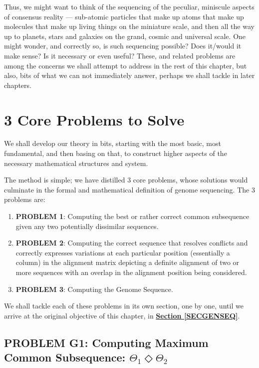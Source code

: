 \documentclass[a4paper, 18pt]{book} %
\begin{document}
Thus, we might want to think of the sequencing of the peculiar, miniscule aspects of consensus reality --- sub-atomic particles that make up atoms that make up molecules that make up living things on the miniature scale, and then all the way up to planets, stars and galaxies on the grand, cosmic and universal scale. One might wonder, and correctly so, is such sequencing possible? Does it/would it make sense? Is it necessary or even useful? These, and related problems are among the concerns we shall attempt to address in the rest of this chapter, but also, bits of what we can not immediately answer, perhaps we shall tackle in later chapters.

\section{3 Core Problems to Solve}

We shall develop our theory in bits, starting with the most basic, most fundamental, and then basing on that, to construct higher aspects of the necessary mathematical structures and system.

The method is simple; we have distilled 3 core problems, whose solutions would culminate in the formal and mathematical definition of genome sequencing. The 3 problems are:


\begin{enumerate}
\item \textbf{PROBLEM 1}: Computing the best or rather correct common subsequence given any two potentially dissimilar sequences.
\item \textbf{PROBLEM 2}: Computing the correct sequence that resolves conflicts and correctly expresses variations at each particular position (essentially a column) in the alignment matrix depicting a definite alignment of two or more sequences with an overlap in the alignment position being considered.
\item \textbf{PROBLEM 3}: Computing the Genome Sequence.
\end{enumerate}

We shall tackle each of these problems in its own section, one by one, until we arrive at the original objective of this chapter, in \textbf{\hyperref[SECGENSEQ]{Section \ref{SECGENSEQ}}}.

\subsection{PROBLEM G1: Computing Maximum Common Subsequence: $\Theta_1 \Diamond \Theta_2$}
\label{PROBG1}
\end{document}
